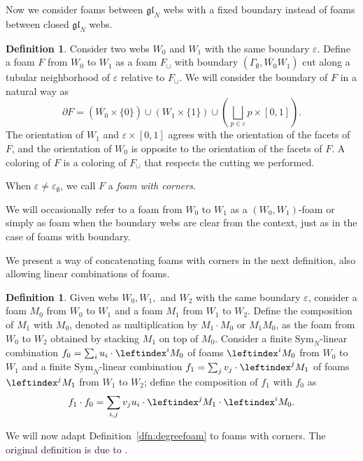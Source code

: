 \documentclass[12pt]{amsart}
\theoremstyle{definition}
\newtheorem{definition}[theorem]{Definition}
\theoremstyle{remark}
\numberwithin{equation}{section}
\numberwithin{figure}{section}
\newcommand{\GL}{\mathfrak{gl}}
\newcommand{\emptylist}{\varepsilon_{\emptyset}}
\newcommand{\emptyweb}{\Gamma_{\emptyset}}
\newcommand{\Symf}{\mathrm{Sym}_N}
\begin{document}
Now we consider foams between $\GL_N$ webs with a fixed boundary instead of foams between closed $\GL_N$ webs.

\begin{definition}\label{def:foamfromto}
Consider two webs $W_0$ and $W_1$ with the same boundary $\varepsilon$.
Define a foam $F$ from $W_0$ to $W_1$ as a foam $F_\cup$ with boundary
$(\emptyweb,\overline{W_0}W_1)$ cut along a tubular neighborhood of
$\varepsilon$ relative to $F_\cup$. We will consider the boundary of $F$ in
a natural way as
\[
\partial F=(\overline{W_0}\times\{0\})\cup(W_1\times\{1\})
\cup\left(\bigsqcup_{p\in\varepsilon}p\times[0,1]\right).
\]
The orientation of $W_1$ and $\varepsilon\times[0,1]$ agrees with the
orientation of the facets of $F$, and the orientation of $W_0$ is opposite
to the orientation of the facets of $F$. A coloring of $F$ is a coloring of
$F_\cup$ that respects the cutting we performed.

When $\varepsilon\neq\emptylist$, we call $F$ a \emph{foam with corners}.
\end{definition}

We will occasionally refer to a foam from $W_0$ to $W_1$ as a
$(W_0,W_1)$-foam or simply as foam when the boundary webs are clear from the context, just as in the case of foams with boundary.

We present a way of concatenating foams with corners in the next definition, also allowing linear combinations of foams.

\begin{definition}\label{Foam-Compo-Conca}
Given webs $W_0,W_1,$ and $W_2$ with the same boundary $\varepsilon$,
consider a foam $M_0$ from $W_0$ to $W_1$ and a foam $M_1$ from $W_1$ to
$W_2$. Define the composition of $M_1$ with $M_0$, denoted as multiplication by
$M_1\cdot M_0$ or $M_1 M_0$, as the foam from $W_0$ to $W_2$ obtained by stacking $M_1$
on top of $M_0$. Consider a finite $\Symf$-linear combination
$f_0=\sum_i u_i\cdot\leftindex^i M_0$ of foams $\leftindex^i M_0$ from
$W_0$ to $W_1$ and a finite $\Symf$-linear combination
$f_1=\sum_j v_j\cdot\leftindex^j M_1$ of foams $\leftindex^j M_1$ from
$W_1$ to $W_2$; define the composition of $f_1$ with $f_0$ as
\[
f_1\cdot f_0=\sum_{i,j}v_ju_i\cdot
\leftindex^j M_1\cdot\leftindex^i M_0.
\]
\end{definition}

We will now adapt Definition~\ref{dfn:degreefoam}
to foams with corners. The original definition is due to
\cite[Definition 3.3]{QR2016}.
\end{document}
